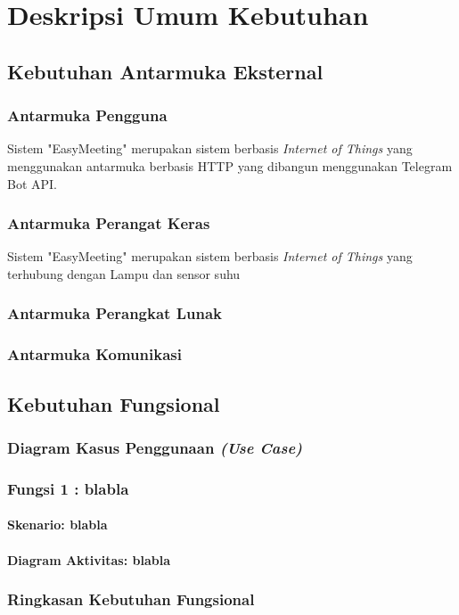 \section{Deskripsi Umum Kebutuhan}
\subsection{Kebutuhan Antarmuka Eksternal}
\subsubsection{Antarmuka Pengguna}
\tab Sistem "EasyMeeting" merupakan sistem berbasis \textit{Internet of Things} yang menggunakan antarmuka berbasis HTTP yang dibangun  menggunakan Telegram Bot API.
\subsubsection{Antarmuka Perangat Keras}
\tab Sistem "EasyMeeting" merupakan sistem berbasis \textit{Internet of Things} yang terhubung dengan Lampu dan sensor suhu
\subsubsection{Antarmuka Perangkat Lunak}
\subsubsection{Antarmuka Komunikasi}
\subsection{Kebutuhan Fungsional}
\subsubsection{Diagram Kasus Penggunaan \textit{(Use Case)}} 
\subsubsection{Fungsi 1 : blabla}
\paragraph{Skenario: blabla}
\paragraph{Diagram Aktivitas: blabla}
\subsubsection{Ringkasan Kebutuhan Fungsional}
